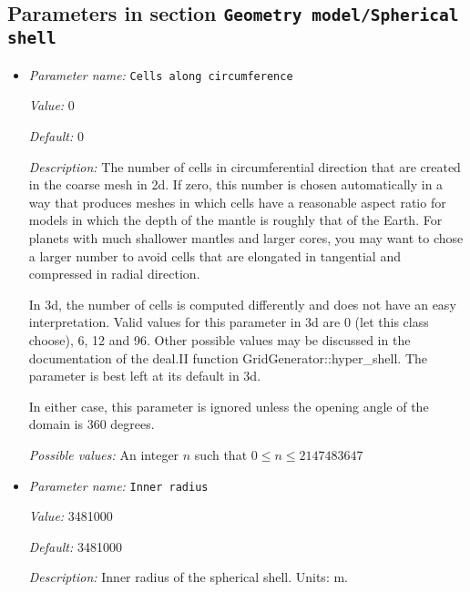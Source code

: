 \subsection{Parameters in section \tt Geometry model/Spherical shell}
\label{parameters:Geometry_20model/Spherical_20shell}

\begin{itemize}
\item {\it Parameter name:} {\tt Cells along circumference}
\label{parameters:Geometry model/Spherical shell/Cells along circumference}


{\it Value:} 0


{\it Default:} 0


{\it Description:} The number of cells in circumferential direction that are created in the coarse mesh in 2d. If zero, this number is chosen automatically in a way that produces meshes in which cells have a reasonable aspect ratio for models in which the depth of the mantle is roughly that of the Earth. For planets with much shallower mantles and larger cores, you may want to chose a larger number to avoid cells that are elongated in tangential and compressed in radial direction.

In 3d, the number of cells is computed differently and does not have an easy interpretation. Valid values for this parameter in 3d are 0 (let this class choose), 6, 12 and 96. Other possible values may be discussed in the documentation of the deal.II function GridGenerator::hyper\_shell. The parameter is best left at its default in 3d.

In either case, this parameter is ignored unless the opening angle of the domain is 360 degrees.


{\it Possible values:} An integer $n$ such that $0\leq n \leq 2147483647$
\item {\it Parameter name:} {\tt Inner radius}
\label{parameters:Geometry model/Spherical shell/Inner radius}


{\it Value:} 3481000


{\it Default:} 3481000


{\it Description:} Inner radius of the spherical shell. Units: m. 




\end{itemize}
